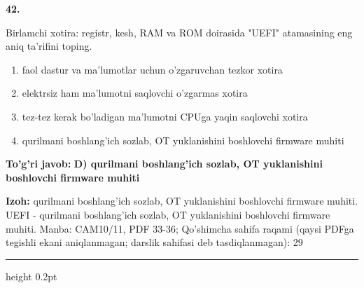 \documentclass[10pt,a4paper]{article}
\begin{document}
{\bfseries\sffamily\color{ink} 42.}
\par
Birlamchi xotira: registr, kesh, RAM va ROM doirasida "UEFI" atamasining eng aniq ta'rifini toping.
\begin{enumerate}[label=\Alph*),leftmargin=9mm]
\item faol dastur va ma'lumotlar uchun o'zgaruvchan tezkor xotira
\item elektrsiz ham ma'lumotni saqlovchi o'zgarmas xotira
\item tez-tez kerak bo'ladigan ma'lumotni CPUga yaqin saqlovchi xotira
\item qurilmani boshlang'ich sozlab, OT yuklanishini boshlovchi firmware muhiti
\end{enumerate}
\begin{tcolorbox}[enhanced,breakable,colback=teal!4,colframe=teal!60!black,boxrule=0.45pt,arc=1.2mm,left=2.7mm,right=2.7mm,top=1.8mm,bottom=1.8mm,before skip=2mm,after skip=2mm]
{\bfseries\sffamily\color{teal}To'g'ri javob:} \textbf{D) qurilmani boshlang'ich sozlab, OT yuklanishini boshlovchi firmware muhiti}
\par\smallskip
{\bfseries Izoh:} qurilmani boshlang'ich sozlab, OT yuklanishini boshlovchi firmware muhiti. UEFI - qurilmani boshlang'ich sozlab, OT yuklanishini boshlovchi firmware muhiti. Manba: CAM10/11, PDF 33-36; Qo'shimcha sahifa raqami (qaysi PDFga tegishli ekani aniqlanmagan; darslik sahifasi deb tasdiqlanmagan): 29
\end{tcolorbox}
\vspace{2mm}\hrule height 0.2pt\vspace{3mm}
\end{document}
